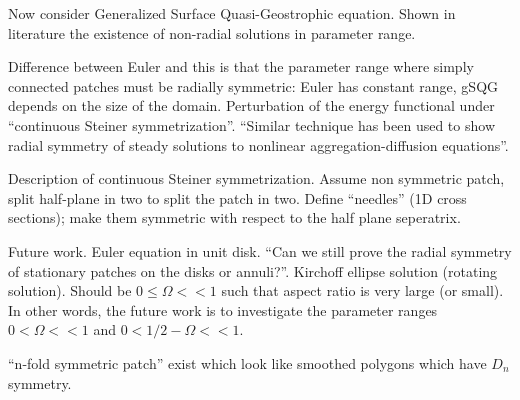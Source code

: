 \begin{description}
{\begin{description}
Now consider Generalized Surface Quasi-Geostrophic equation.
Shown in literature the existence of non-radial solutions
in parameter range.

Difference between Euler and this is that the parameter range
where simply connected patches must be radially symmetric:
Euler has constant range, gSQG depends on the size of the domain.
Perturbation of the energy functional under ``continuous Steiner
symmetrization''.  ``Similar technique has been used to show
radial symmetry of steady solutions to nonlinear aggregation-diffusion
equations''.

Description of continuous Steiner symmetrization. Assume non symmetric patch,
split half-plane in two to split the
patch in two. Define ``needles'' (1D cross sections); make them symmetric
with respect to the half plane seperatrix.

Future work. Euler equation in unit disk.
``Can we still prove the radial symmetry of stationary patches on
the disks or annuli?''. Kirchoff ellipse solution (rotating solution).
Should be $0\leq \Omega << 1$ such that aspect ratio is very large (or small).
In other words, the future work is to investigate the parameter ranges
$0< \Omega << 1$ and $0< 1/2-\Omega <<1$.

``n-fold symmetric patch'' exist which look like smoothed polygons
which have $D_n$ symmetry.
\end{description}
}

\end{description}
